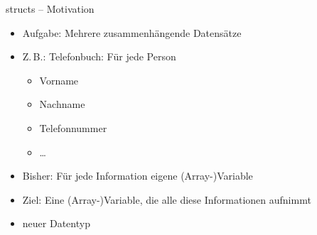 
\begin{frame}{structs -- Motivation}
%
\begin{itemize}
\item Aufgabe: Mehrere zusammenhängende Datensätze
\item Z.\,B.: Telefonbuch: Für jede Person
	\begin{itemize}
	\item Vorname
	\item Nachname
	\item Telefonnummer
	\item \ldots
	\end{itemize}
\item Bisher: Für jede Information eigene (Array-)Variable
\item Ziel: Eine (Array-)Variable, die alle diese Informationen aufnimmt
\item[\Thus] neuer Datentyp
\end{itemize}
%
\end{frame}


